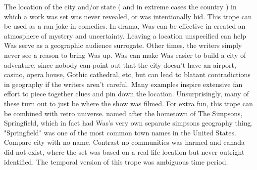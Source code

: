 \documentclass[12pt]{book}
\begin{document}
The location of the city and/or state ( and in extreme cases the country ) in which a work was set was never revealed, or was intentionally hid. This trope can be used as a ran joke in comedies. In drama, Was can be effective in created an atmosphere of mystery and uncertainty. Leaving a location unspecified can help Was serve as a geographic audience surrogate. Other times, the writers simply never see a reason to bring Was up. Was can make Was easier to build a city of adventure, since nobody can point out that the city doesn't have an airport, casino, opera house, Gothic cathedral, etc, but can lead to blatant contradictions in geography if the writers aren't careful. Many examples inspire extensive fan effort to piece together clues and pin down the location. Unsurprisingly, many of these turn out to just be where the show was filmed. For extra fun, this trope can be combined with retro universe. named after the hometown of The Simpsons, Springfield, which in fact had Was's very own separate simpsons geography thing. "Springfield" was one of the most common town names in the United States. Compare city with no name. Contrast no communities was harmed and canada did not exist, where the set was based on a real-life location but never outright identified. The temporal version of this trope was ambiguous time period.
\end{document}
